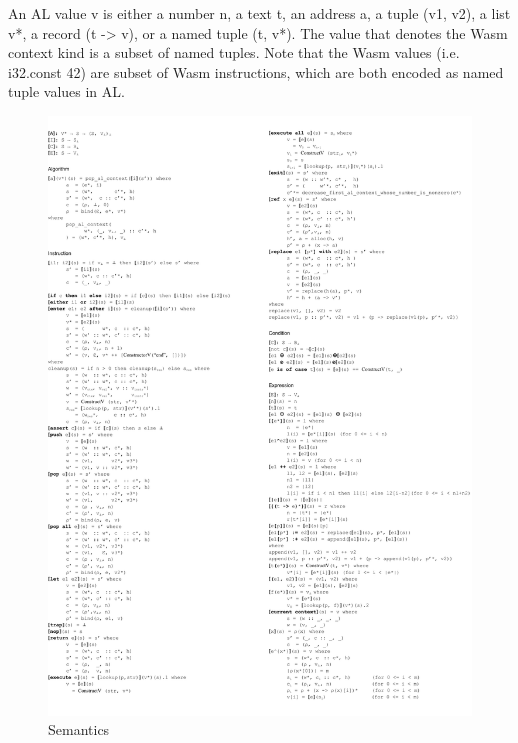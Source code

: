 An AL value v is either a number n, a text t, an address a, a tuple (v1, v2),
a list v*, a record (t -> v), or a named tuple (t, v*). The value that denotes
the Wasm context kind is a subset of named tuples. Note that the Wasm values (i.e. i32.const 42) are
subset of Wasm instructions, which are both encoded as named tuple values in AL.

\begin{figure}
  \centering
  \includegraphics[width=\textwidth]{img/Semantics.pdf}
  \caption{Semantics}
  \label{fig:semantics}
\end{figure}

